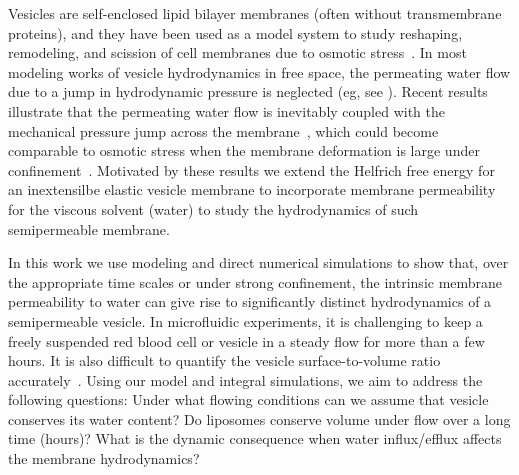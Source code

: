 \documentclass[prb,preprint,showpacs,preprintnumbers,amsmath,amssymb,longbibliography]{revtex4-1}
\begin{document}
Vesicles are self-enclosed lipid bilayer membranes (often without transmembrane proteins), and they 
have been used as a
model system to study reshaping, remodeling, and scission of cell
membranes due to osmotic stress~\cite{OgleckaEtAl2014_eLife, BhatiaRobinsonDimova2020_SoftMatt,
CamposSaric2020_bioRxiv, Dimova2020_GVB, BhatiaChrist2020_SoftMatt}.
In most modeling works of vesicle hydrodynamics in free space, the permeating water flow due to a jump in hydrodynamic pressure is neglected (eg, see \citet{vogl2014effect}).
Recent results illustrate that the permeating water
flow is inevitably coupled with the mechanical pressure jump across the
membrane~\cite{yao-mor2017}, which could become comparable to osmotic
stress when the membrane deformation is large under confinement~\cite{LiMoriSun2015_PRL,
yao-mor2017}. 
%
Motivated by these results we extend the Helfrich free energy for an inextensilbe elastic vesicle membrane to incorporate membrane permeability 
for the viscous solvent (water) to study the hydrodynamics of such semipermeable membrane.




In this work we use modeling and direct
numerical simulations to show that, over the appropriate time scales or
under strong confinement, the intrinsic membrane permeability to water
can give rise to significantly distinct hydrodynamics of a semipermeable
vesicle. 
%
In microfluidic experiments, it is challenging to keep a freely
suspended red blood cell or vesicle in a steady flow for more than a few
hours. It is also difficult to quantify the vesicle surface-to-volume
ratio accurately~\cite{MinetttiCallensCoupier2008_AppliedOptics}. 
Using our model and integral simulations, we aim to address the following questions:
%
Under what flowing conditions can we assume that vesicle conserves its water content?
Do liposomes conserve
volume under flow over a long time (hours)? What is the dynamic consequence when water
influx/efflux affects the membrane hydrodynamics? 
\end{document}
